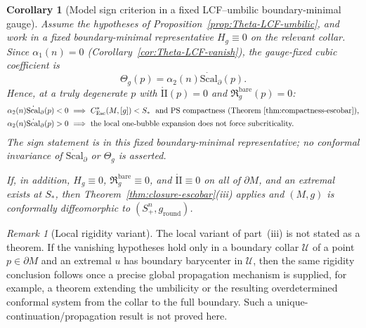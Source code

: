 \documentclass[11pt,reqno,a4paper]{amsart}
\numberwithin{equation}{section}
\theoremstyle{plain}
\newtheorem{corollary}[theorem]{Corollary}
\newcommand{\Scal}{\mathrm{Scal}}
\newcommand{\Esc}{\ensuremath{\mathrm{Esc}}}
\theoremstyle{remark}
\newtheorem{remark}[theorem]{Remark}
\theoremstyle{plain}
\begin{document}
\begin{corollary}[Model sign criterion in a fixed LCF--umbilic boundary-minimal gauge]
\label{cor:model-LCF}
Assume the hypotheses of Proposition~\ref{prop:Theta-LCF-umbilic}, and work in
a fixed boundary-minimal representative $H_g\equiv0$ on the relevant collar.
Since $\alpha_1(n)=0$ (Corollary~\ref{cor:Theta-LCF-vanish}), the gauge-fixed
cubic coefficient is
\[
\Theta_g(p)=\alpha_2(n)\dot{\Scal}_\partial(p).
\]
Hence, at a truly degenerate $p$ with
$\mathring{\mathrm{II}}(p)=0$ and $\mathfrak R_g^{\mathrm{bare}}(p)=0$:
\begin{align*}
\alpha_2(n)\dot{\Scal}_\partial(p)<0
\ & \Longrightarrow\ C_{\Esc}^*(M,[g])<S_\ast
\ \text{ and PS compactness
(Theorem~\ref{thm:compactness-escobar}),}
\\
\alpha_2(n)\dot{\Scal}_\partial(p)>0
\ & \Longrightarrow\ \text{the local one-bubble expansion does not force subcriticality.}
\end{align*}
The sign statement is in this fixed boundary-minimal representative; no
conformal invariance of $\dot{\Scal}_\partial$ or $\Theta_g$ is asserted.

If, in addition, $H_g\equiv0$, $\mathfrak R_g^{\mathrm{bare}}\equiv0$, and
$\mathring{\mathrm{II}}\equiv0$ on \emph{all of $\partial M$},
and an extremal exists at $S_\ast$, then
Theorem~\ref{thm:closure-escobar}\textup{(iii)} applies and $(M,g)$ is
conformally diffeomorphic to $(S^n_+,g_{\mathrm{round}})$.
\end{corollary}

\begin{remark}[Local rigidity variant]\label{rem:local-rigidity-scope}
The local variant of part~\textup{(iii)} is not stated as a theorem.
If the vanishing hypotheses hold only in a boundary collar $\mathcal U$ of a point $p\in\partial M$
and an extremal $u$ has boundary barycenter in $\mathcal U$, then the same rigidity conclusion follows
once a precise global propagation mechanism is supplied, for example, a theorem extending the umbilicity or the resulting
overdetermined conformal system from the collar to the full boundary. Such a unique-continuation/propagation
result is not proved here.
\end{remark}
\end{document}
